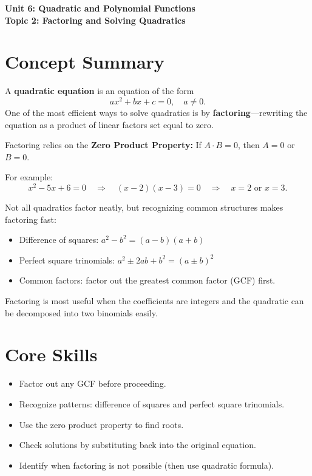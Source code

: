\documentclass[14pt]{extarticle}
\begin{document}
\raggedright
{}

\begin{center}
    \LARGE \textbf{Unit 6: Quadratic and Polynomial Functions} \\[6pt]
    \Large \textbf{Topic 2: Factoring and Solving Quadratics}
\end{center}

\vspace{1em}

\section*{Concept Summary}

A \textbf{quadratic equation} is an equation of the form
\[
ax^2 + bx + c = 0, \quad a \ne 0.
\]
One of the most efficient ways to solve quadratics is by \textbf{factoring}—rewriting the equation as a product of linear factors set equal to zero.

Factoring relies on the \textbf{Zero Product Property:}  
If \(A \cdot B = 0\), then \(A = 0\) or \(B = 0.\)

For example:
\[
x^2 - 5x + 6 = 0 \quad \Rightarrow \quad (x - 2)(x - 3) = 0 \quad \Rightarrow \quad x = 2 \text{ or } x = 3.
\]

Not all quadratics factor neatly, but recognizing common structures makes factoring fast:
\begin{itemize}
  \item Difference of squares: \(a^2 - b^2 = (a - b)(a + b)\)
  \item Perfect square trinomials: \(a^2 \pm 2ab + b^2 = (a \pm b)^2\)
  \item Common factors: factor out the greatest common factor (GCF) first.
\end{itemize}

Factoring is most useful when the coefficients are integers and the quadratic can be decomposed into two binomials easily.

\section*{Core Skills}
\begin{itemize}
  \item Factor out any GCF before proceeding.
  \item Recognize patterns: difference of squares and perfect square trinomials.
  \item Use the zero product property to find roots.
  \item Check solutions by substituting back into the original equation.
  \item Identify when factoring is not possible (then use quadratic formula).
\end{itemize}
\end{document}
